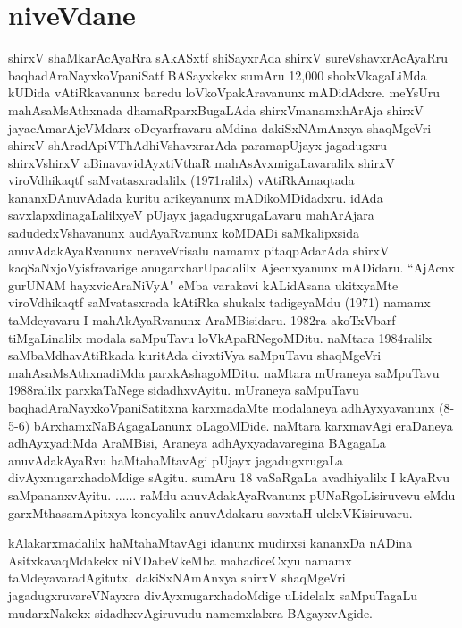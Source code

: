 \chapter{niveVdane}

shirxV shaMkarAcAyaRra sAkASxtf shiSayxrAda shirxV sureVshavxrAcAyaRru baqhadAraNayx\-koVpaniSatf BASayxkekx sumAru 12,000 sholxVkagaLiMda kUDida vAtiRkavanunx baredu loVkoVpakAravanunx mADidAdxre. meYsUru mahAsaMsAthxnada dhamaRparxBugaLAda shirxVmanamxhArAja shirxV jayacAmarAjeVMdarx oDeyarfravaru aMdina dakiSxNAmAnxya shaqMgeVri shirxV shAradApiVThAdhiVshavxrarAda paramapUjayx jagadugxru shirxVshirxV aBinavavidAyxtiVthaR mahAsAvxmigaLavaralilx shirxV viroVdhikaqtf saMvatasxradalilx (1971ralilx) vAtiRkAmaqtada kananxDAnuvAdada kuritu arikeyanunx mADikoMDidadxru. idAda savxlapxdinagaLalilxyeV pUjayx jagadugxrugaLavaru mahArAjara sadudedxVshavanunx audAyaRvanunx koMDADi saMkalipxsida anuvAdakAyaRvanunx neraveVrisalu namamx pitaqpAdarAda shirxV kaqSaNxjoVyisfravarige anugarxharUpadalilx Ajecnxyanunx mADidaru. “AjAcnx gurUNAM hayxvicAraNiVyA" eMba varakavi kALidAsana ukitxyaMte viroVdhikaqtf saMvatasxrada kAtiRka shukalx tadigeyaMdu (1971) namamx taMdeyavaru I mahAkAyaRvanunx AraMBisidaru. 1982ra akoTxVbarf tiMgaLinalilx modala saMpuTavu loVkApaRNegoMDitu. naMtara 1984ralilx saMbaMdhavAtiRkada kuritAda divxtiVya saMpuTavu shaqMgeVri mahAsaMsAthxnadiMda parxkAshagoMDitu. naMtara mUraneya saMpuTavu 1988ralilx parxkaTaNege sidadhxvAyitu. mUraneya saMpuTavu baqhadAraNayxkoVpaniSatitxna karxmadaMte modalaneya adhAyxyavanunx (8-5-6) bArxhamxNaBAgagaLanunx oLagoMDide. naMtara karxmavAgi eraDaneya adhAyxyadiMda AraMBisi, Araneya adhAyxyadavaregina BAgagaLa anuvAdakAyaRvu haMtahaMtavAgi pUjayx jagadugxrugaLa divAyxnugarxhadoMdige sAgitu. sumAru 18 vaSaRgaLa avadhiyalilx I kAyaRvu saMpananxvAyitu. ...... raMdu anuvAdakAyaRvanunx pUNaRgoLisiruvevu eMdu garxMthasamApitxya koneyalilx anuvAdakaru savxtaH ulelxVKisiruvaru. 

kAlakarxmadalilx haMtahaMtavAgi idanunx mudirxsi kananxDa nADina AsitxkavaqMdakekx niVDabeVkeMba mahadiceCxyu namamx taMdeyavaradAgitutx. dakiSxNAmAnxya shirxV shaqMgeVri jagadugxruvareVNayxra divAyxnugarxhadoMdige uLidelalx saMpuTagaLu \break mudarxNakekx sidadhxvAgiruvudu namemxlalxra BAgayxvAgide.

